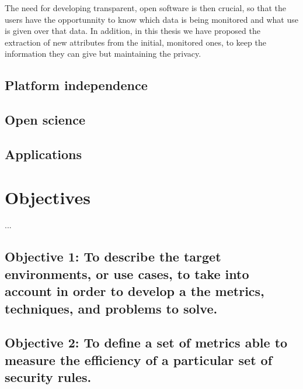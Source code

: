 The need for developing transparent, open software is then crucial, so that the users have the opportunnity to know which data is being monitored and what use is given over that data. In addition, in this thesis we have proposed the extraction of new attributes from the initial, monitored ones, to keep the information they can give but maintaining the privacy.

\subsection{Platform independence}
\label{subsec:platf_ind}


\subsection{Open science}
\label{subsec:openS}


\subsection{Applications}
\label{subsec:apps}

\section{Objectives}                     
\label{sec:intro:objs}

...

\newcommand{\objectivescenarios}{To describe the target environments, or use cases, to take into account in order to develop a the metrics, techniques, and problems to solve.} %

 \subsection*{Objective 1: \objectivescenarios}
\label{subsec:intro:obj:problems}

\newcommand{\objectivemetrics}{To define a set of metrics able to measure the efficiency of a particular set of security rules.}

\subsection*{Objective 2: \objectivemetrics} 
\label{subsec:intro:obj:methodology}

